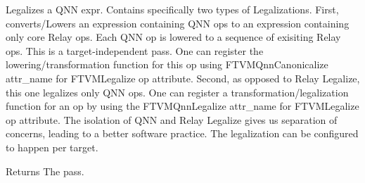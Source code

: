 Legalizes a Q\+NN expr. Contains specifically two types of Legalizations. First, converts/\+Lowers an expression containing Q\+NN ops to an expression containing only core Relay ops. Each Q\+NN op is lowered to a sequence of exisiting Relay ops. This is a target-\/independent pass. One can register the lowering/transformation function for this op using F\+T\+V\+M\+Qnn\+Canonicalize attr\+\_\+name for F\+T\+V\+M\+Legalize op attribute. Second, as opposed to Relay Legalize, this one legalizes only Q\+NN ops. One can register a transformation/legalization function for an op by using the F\+T\+V\+M\+Qnn\+Legalize attr\+\_\+name for F\+T\+V\+M\+Legalize op attribute. The isolation of Q\+NN and Relay Legalize gives us separation of concerns, leading to a better software practice. The legalization can be configured to happen per target. 

\begin{DoxyReturn}{Returns}
The pass. 
\end{DoxyReturn}
